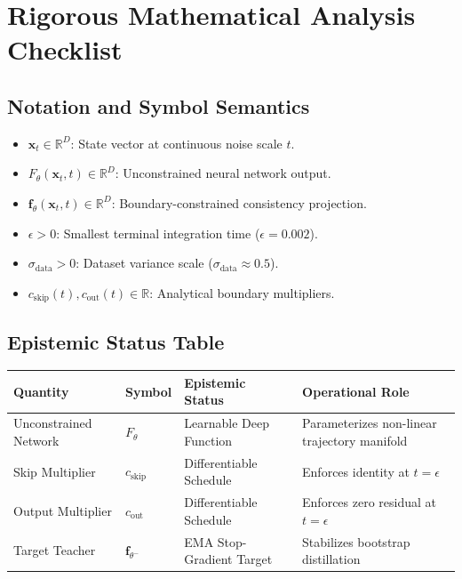 \documentclass[11pt,a4paper]{article}
\theoremstyle{definition}
\begin{document}
\section{Rigorous Mathematical Analysis Checklist}

\subsection{Notation and Symbol Semantics}
\begin{itemize}
    \item $\mathbf{x}_t \in \mathbb{R}^D$: State vector at continuous noise scale $t$.
    \item $F_\theta(\mathbf{x}_t, t) \in \mathbb{R}^D$: Unconstrained neural network output.
    \item $\mathbf{f}_\theta(\mathbf{x}_t, t) \in \mathbb{R}^D$: Boundary-constrained consistency projection.
    \item $\epsilon > 0$: Smallest terminal integration time ($\epsilon = 0.002$).
    \item $\sigma_{\text{data}} > 0$: Dataset variance scale ($\sigma_{\text{data}} \approx 0.5$).
    \item $c_{\text{skip}}(t), c_{\text{out}}(t) \in \mathbb{R}$: Analytical boundary multipliers.
\end{itemize}

\subsection{Epistemic Status Table}
\begin{table}[h]
\centering
\small
\begin{tabular}{@{}llll@{}}
\toprule
\textbf{Quantity} & \textbf{Symbol} & \textbf{Epistemic Status} & \textbf{Operational Role} \\
\midrule
Unconstrained Network & $F_\theta$ & Learnable Deep Function & Parameterizes non-linear trajectory manifold \\
Skip Multiplier & $c_{\text{skip}}$ & Differentiable Schedule & Enforces identity at $t = \epsilon$ \\
Output Multiplier & $c_{\text{out}}$ & Differentiable Schedule & Enforces zero residual at $t = \epsilon$ \\
Target Teacher & $\mathbf{f}_{\theta^-}$ & EMA Stop-Gradient Target & Stabilizes bootstrap distillation \\
\bottomrule
\end{tabular}
\end{table}
\end{document}
